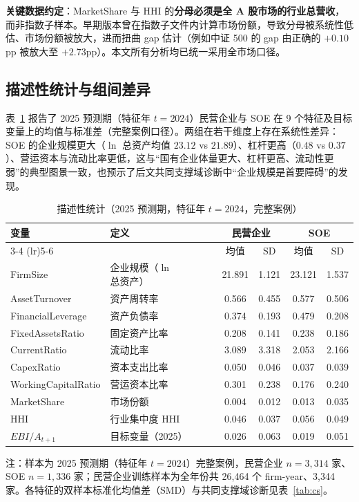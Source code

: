 \documentclass[11pt,a4paper]{ctexart}
\begin{document}
\textbf{关键数据约定}：MarketShare 与 HHI 的\textbf{分母必须是全 A 股市场的行业总营收}，而非指数子样本。早期版本曾在指数子文件内计算市场份额，导致分母被系统性低估、市场份额被放大，进而扭曲 gap 估计（例如中证 500 的 gap 由正确的 $+0.10$pp 被放大至 $+2.73$pp）。本文所有分析均已统一采用全市场口径。

\subsection{描述性统计与组间差异}

表~\ref{tab:descriptives} 报告了 2025 预测期（特征年 $t=2024$）民营企业与 SOE 在 9 个特征及目标变量上的均值与标准差（完整案例口径）。两组在若干维度上存在系统性差异：SOE 的企业规模更大（$\ln$ 总资产均值 $23.12$ vs $21.89$）、杠杆更高（$0.48$ vs $0.37$）、营运资本与流动比率更低，这与“国有企业体量更大、杠杆更高、流动性更弱”的典型图景一致，也预示了后文共同支撑域诊断中“企业规模是首要障碍”的发现。

\begin{table}[htbp]
\centering
\caption{描述性统计（2025 预测期，特征年 $t=2024$，完整案例）}
\label{tab:descriptives}
\begin{threeparttable}
\small
\begin{tabular}{llcccc}
\toprule
变量 & 定义 & \multicolumn{2}{c}{民营企业} & \multicolumn{2}{c}{SOE} \\
\cmidrule(lr){3-4} \cmidrule(lr){5-6}
& & 均值 & SD & 均值 & SD \\
\midrule
FirmSize & 企业规模（$\ln$ 总资产） & 21.891 & 1.121 & 23.121 & 1.537 \\
AssetTurnover & 资产周转率 & 0.566 & 0.455 & 0.577 & 0.506 \\
FinancialLeverage & 资产负债率 & 0.374 & 0.193 & 0.479 & 0.208 \\
FixedAssetsRatio & 固定资产比率 & 0.208 & 0.141 & 0.238 & 0.186 \\
CurrentRatio & 流动比率 & 3.089 & 3.318 & 2.053 & 2.166 \\
CapexRatio & 资本支出比率 & 0.050 & 0.046 & 0.037 & 0.039 \\
WorkingCapitalRatio & 营运资本比率 & 0.301 & 0.238 & 0.176 & 0.240 \\
MarketShare & 市场份额 & 0.004 & 0.012 & 0.013 & 0.035 \\
HHI & 行业集中度 HHI & 0.046 & 0.037 & 0.056 & 0.049 \\
$EBI/A_{t+1}$ & 目标变量（2025） & 0.026 & 0.063 & 0.019 & 0.051 \\
\bottomrule
\end{tabular}
\begin{tablenotes}
\footnotesize\raggedright
\item 注：样本为 2025 预测期（特征年 $t=2024$）完整案例，民营企业 $n=3{,}314$ 家、SOE $n=1{,}336$ 家；民营企业训练样本为全年份共 26{,}464 个 firm-year、3{,}344 家。各特征的双样本标准化均值差（SMD）与共同支撑域诊断见表~\ref{tab:cs}。
\end{tablenotes}
\end{threeparttable}
\end{table}
\end{document}
